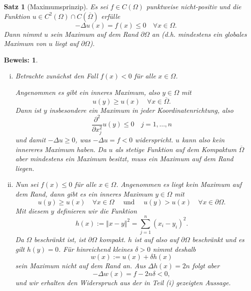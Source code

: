 \documentclass[
]{mycourse}
\theoremstyle{mythm}
\newtheorem{theorem}{Satz}[chapter]
\theoremstyle{break}
\newtheorem*{beweis}{Beweis:}
\newcommand{\norm}[1]{\left\Vert#1\right\Vert}		%
\newcommand{\labeq}[1]{\label{eq:#1}}			%
\begin{document}
\begin{theorem}[Maximumsprinzip]\label{satz:maxprinzip}
Es sei $f\in C(\Omega)$ punktweise nicht-positiv und die Funktion $u\in C^2(\Omega)\cap C(\overline \Omega)$ erfülle
\begin{equation}\labeq{laplace}
-\Delta u(x)=f(x)\leq 0 \quad \forall x\in \Omega.
\end{equation}
Dann nimmt $u$ sein Maximum auf dem Rand $\partial \Omega$ an (d.h. mindestens ein globales Maximum von $u$ liegt auf  $\partial \Omega$).
\end{theorem}
\begin{beweis}
\begin{enumerate}[(i)]
\item Betrachte zunächst den Fall $f(x)<0$ für alle $x\in \Omega$. 

Angenommen es gibt ein inneres Maximum, also $y\in \Omega$ mit
\[
u(y)\geq u(x) \quad \forall x\in \overline{\Omega}.
\]
Dann ist $y$ insbesondere ein Maximum in jeder Koordinatenrichtung, also
\[
\frac{\partial^2}{\partial x_j^2} u(y)\leq 0 \quad j=1,\ldots,n
\]
und damit $-\Delta u\geq 0$, was $-\Delta u=f<0$ widerspricht. $u$ kann also kein 
innereres Maximum haben. Da $u$ als stetige Funktion auf dem Kompaktum $\overline \Omega$ aber mindestens ein Maximum besitzt, muss ein Maximum auf dem Rand liegen.
%
\item Nun sei $f(x)\leq 0$ für alle $x\in \Omega$. 
Angenommen es liegt kein Maximum auf dem Rand, dann gibt es ein inneres Maximum $y\in \Omega$ mit
\[
u(y)\geq u(x) \quad \forall x\in \Omega\quad \mbox{ und } \quad
u(y)> u(x) \quad \forall x\in \partial \Omega.
\]
Mit diesem $y$ definieren wir die Funktion
\[
h(x):=\norm{x-y}^2=\sum_{j=1}^n (x_i-y_i)^2.
\]
Da $\Omega$ beschränkt ist, ist $\partial \Omega$ kompakt. 
$h$ ist auf also auf $\partial \Omega$ beschränkt und es gilt $h(y)=0$. Für hinreichend kleines $\delta>0$ nimmt deshalb 
\[
w(x):=u(x)+\delta h(x)
\]
sein Maximum nicht auf dem Rand an. Aus $\Delta h(x)=2n$ folgt aber
\[
-\Delta w(x)=f-2n\delta<0,
\]
und wir erhalten den Widerspruch aus der in Teil (i) gezeigten Aussage.
\end{enumerate}
\end{beweis}
\end{document}
